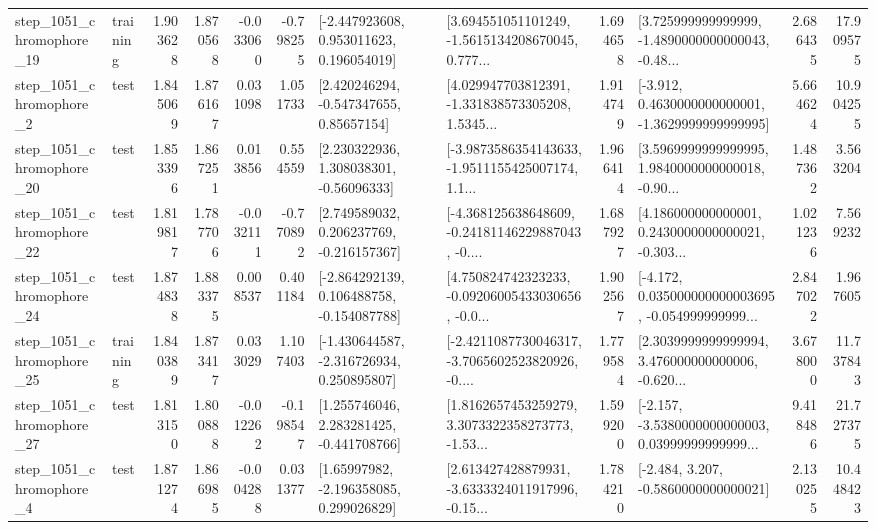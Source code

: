 \begin{tabular}{llrrrrllrlrr}
 step\_1051\_chromophore\_19 &  training &      1.903628 &    1.870568 &     -0.033060 & -0.798255 &    [-2.447923608, 0.953011623, 0.196054019] &  [3.694551051101249, -1.5615134208670045, 0.777... &       1.694658 &  [3.725999999999999, -1.4890000000000043, -0.48... &            2.686435 &         17.909575 \\
  step\_1051\_chromophore\_2 &      test &      1.845069 &    1.876167 &      0.031098 &  1.051733 &     [2.420246294, -0.547347655, 0.85657154] &  [4.029947703812391, -1.331838573305208, 1.5345... &       1.914749 &  [-3.912, 0.4630000000000001, -1.3629999999999995] &            5.664624 &         10.904255 \\
 step\_1051\_chromophore\_20 &      test &      1.853396 &    1.867251 &      0.013856 &  0.554559 &     [2.230322936, 1.308038301, -0.56096333] &  [-3.9873586354143633, -1.9511155425007174, 1.1... &       1.966414 &  [3.5969999999999995, 1.9840000000000018, -0.90... &            1.487362 &          3.563204 \\
 step\_1051\_chromophore\_22 &      test &      1.819817 &    1.787706 &     -0.032111 & -0.770892 &    [2.749589032, 0.206237769, -0.216157367] &  [-4.368125638648609, -0.24181146229887043, -0.... &       1.687927 &  [4.186000000000001, 0.2430000000000021, -0.303... &            1.021236 &          7.569232 \\
 step\_1051\_chromophore\_24 &      test &      1.874838 &    1.883375 &      0.008537 &  0.401184 &   [-2.864292139, 0.106488758, -0.154087788] &  [4.750824742323233, -0.09206005433030656, -0.0... &       1.902567 &  [-4.172, 0.035000000000003695, -0.054999999999... &            2.847022 &          1.967605 \\
 step\_1051\_chromophore\_25 &  training &      1.840389 &    1.873417 &      0.033029 &  1.107403 &   [-1.430644587, -2.316726934, 0.250895807] &  [-2.4211087730046317, -3.7065602523820926, -0.... &       1.779584 &  [2.3039999999999994, 3.476000000000006, -0.620... &            3.678000 &         11.737843 \\
 step\_1051\_chromophore\_27 &      test &      1.813150 &    1.800888 &     -0.012262 & -0.198547 &    [1.255746046, 2.283281425, -0.441708766] &  [1.8162657453259279, 3.3073322358273773, -1.53... &       1.599200 &  [-2.157, -3.5380000000000003, 0.03999999999999... &            9.418486 &         21.727375 \\
  step\_1051\_chromophore\_4 &      test &      1.871274 &    1.866985 &     -0.004288 &  0.031377 &     [1.65997982, -2.196358085, 0.299026829] &  [2.613427428879931, -3.6333324011917996, -0.15... &       1.784210 &               [-2.484, 3.207, -0.5860000000000021] &            2.130255 &         10.448423 \\

\end{tabular}
